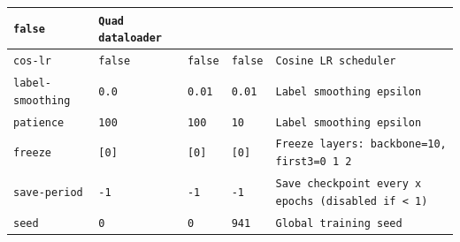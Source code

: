 \begin{table}
\begin{center}
\begin{tabular}{ | m{8em} | m{5em} | m{5em} | 
 m{5em}| m{15em} | }
                \centering\texttt{false} & 
                \texttt{Quad dataloader}
                \tabularnewline
            \hline
                \texttt{cos-lr} &
                \centering\texttt{false} & 
                \centering\texttt{false} & 
                \centering\texttt{false} & 
                \texttt{Cosine LR scheduler}
                \tabularnewline
            \hline
                \texttt{label-smoothing} &
                \centering\texttt{0.0} & 
                \centering\texttt{0.01} & 
                \centering\texttt{0.01} & 
                \texttt{Label smoothing epsilon}
                \tabularnewline
            \hline
                \texttt{patience} &
                \centering\texttt{100} & 
                \centering\texttt{100} & 
                \centering\texttt{10} & 
                \texttt{Label smoothing epsilon}
                \tabularnewline
            \hline
                \texttt{freeze} &
                \centering\texttt{[0]} & 
                \centering\texttt{[0]} & 
                \centering\texttt{[0]} & 
                \texttt{Freeze layers: backbone=10, first3=0 1 2}
                \tabularnewline
            \hline
                \texttt{save-period} &
                \centering\texttt{-1} & 
                \centering\texttt{-1} & 
                \centering\texttt{-1} & 
                \texttt{Save checkpoint every x epochs (disabled if < 1)}
                \tabularnewline
            \hline
                \texttt{seed} &
                \centering\texttt{0} & 
                \centering\texttt{0} & 
                \centering\texttt{941} & 
                \texttt{Global training seed}
                \tabularnewline
            \hline
        \end{tabular}  
    \end{center}
    \label{table:Configuration}
\end{table}